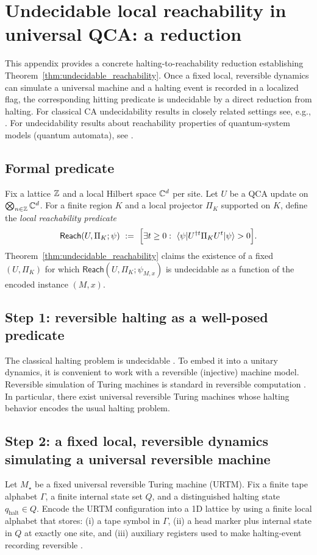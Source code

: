\section{Undecidable local reachability in universal QCA: a reduction}
\label{app:reachability_undecidability}

This appendix provides a concrete halting-to-reachability reduction establishing Theorem~\ref{thm:undecidable_reachability}.
Once a fixed local, reversible dynamics can simulate a universal machine and a halting event is recorded in a localized flag, the corresponding hitting predicate is undecidable by a direct reduction from halting.
For classical CA undecidability results in closely related settings see, e.g., \cite{Kari1990,Kari1994}.
For undecidability results about reachability properties of quantum-system models (quantum automata), see \cite{LiYing2014}.

\subsection{Formal predicate}
Fix a lattice $\mathbb{Z}$ and a local Hilbert space $\mathbb{C}^d$ per site.
Let $U$ be a QCA update on $\bigotimes_{n\in\mathbb{Z}}\mathbb{C}^d$.
For a finite region $K$ and a local projector $\Pi_K$ supported on $K$, define the \emph{local reachability predicate}
\begin{equation}
\mathsf{Reach}(U,\Pi_K;\psi)\ :=\ \Bigl[\exists t\ge 0:\ \langle\psi|U^{\dagger t}\Pi_K U^t|\psi\rangle>0\Bigr].
\end{equation}
Theorem~\ref{thm:undecidable_reachability} claims the existence of a fixed $(U,\Pi_K)$ for which $\mathsf{Reach}(U,\Pi_K;\psi_{M,x})$ is undecidable as a function of the encoded instance $(M,x)$.

\subsection{Step 1: reversible halting as a well-posed predicate}
The classical halting problem is undecidable \cite{Turing1936}.
To embed it into a unitary dynamics, it is convenient to work with a reversible (injective) machine model.
Reversible simulation of Turing machines is standard in reversible computation \cite{Bennett1973,Bennett1989}.
In particular, there exist universal reversible Turing machines whose halting behavior encodes the usual halting problem.

\subsection{Step 2: a fixed local, reversible dynamics simulating a universal reversible machine}
Let $M_\star$ be a fixed universal reversible Turing machine (URTM).
Fix a finite tape alphabet $\Gamma$, a finite internal state set $Q$, and a distinguished halting state $q_{\mathrm{halt}}\in Q$.
Encode the URTM configuration into a 1D lattice by using a finite local alphabet that stores:
(i) a tape symbol in $\Gamma$,
(ii) a head marker plus internal state in $Q$ at exactly one site, and
(iii) auxiliary registers used to make halting-event recording reversible \cite{Bennett1973,Bennett1989}.

